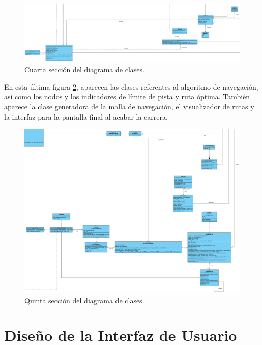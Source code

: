 \begin{figure}[H]
    \centering
    \includegraphics[width=\textwidth]{imagenes/classDiagram4.png}
    \caption{Cuarta sección del diagrama de clases.}
    \label{fig:class4}
\end{figure}

En esta última figura \ref{fig:class5}, aparecen las clases referentes al algoritmo de navegación, así como los nodos y los indicadores de límite de pista y ruta óptima. También aparece la clase generadora de la malla de navegación, el visualizador de rutas y la interfaz para la pantalla final al acabar la carrera.

\begin{figure}[H]
    \centering
    \includegraphics[width=\textwidth]{imagenes/classDiagram5.png}
    \caption{Quinta sección del diagrama de clases.}
    \label{fig:class5}
\end{figure}

\newpage

\section{Diseño de la Interfaz de Usuario}


